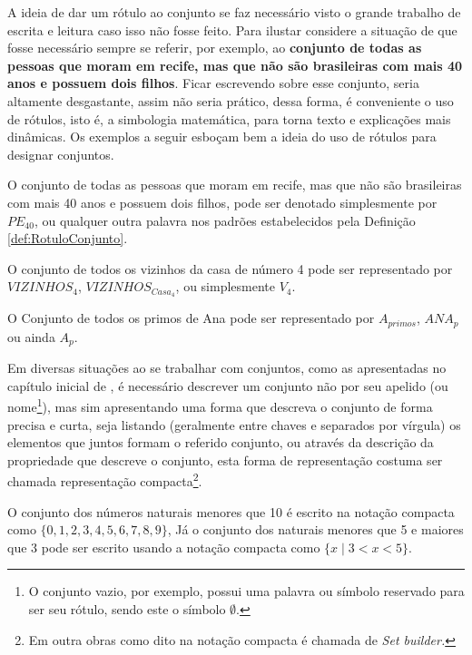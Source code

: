 A ideia de dar um rótulo ao conjunto se faz necessário visto o grande trabalho de escrita e leitura caso isso não fosse feito. Para ilustar considere a situação de que fosse necessário sempre se referir, por exemplo, ao \textbf{conjunto de todas as pessoas que moram em recife, mas que não são brasileiras com mais 40 anos e possuem dois filhos}. Ficar escrevendo sobre esse conjunto, seria altamente desgastante, assim não seria prático, dessa forma, é conveniente o uso de rótulos, isto é, a simbologia matemática, para torna texto e explicações mais dinâmicas. Os exemplos a seguir esboçam bem a ideia do uso de rótulos para designar conjuntos.

\begin{exemplo}\label{exe:RotuloConjunto1}
  O conjunto de todas as pessoas que moram em recife, mas que não são brasileiras com mais 40 anos e possuem dois filhos, pode ser denotado simplesmente por $PE_{40}$, ou qualquer outra palavra nos padrões estabelecidos pela Definição \ref{def:RotuloConjunto}.
\end{exemplo}

\begin{exemplo}\label{exe:RotuloConjunto2}
	O conjunto de todos os vizinhos da casa de número 4 pode ser representado por $VIZINHOS_4$, $VIZINHOS_{Casa_4}$, ou simplesmente  $V_4$.
\end{exemplo}

\begin{exemplo}\label{exe:RotuloConjunto3}
  O Conjunto de todos os primos de Ana pode ser representado por $A_{primos}$, $ANA_{p}$ ou ainda $A_p$.
\end{exemplo}

Em diversas situações ao se trabalhar com conjuntos, como as apresentadas no capítulo inicial de \cite{lipschutz1978-TC}, é necessário descrever um conjunto não por seu apelido (ou nome\footnote{O conjunto vazio, por exemplo, possui uma palavra ou símbolo reservado para ser seu rótulo, sendo este o símbolo $\emptyset$.}), mas sim apresentando uma forma que descreva o conjunto de forma precisa e curta, seja listando (geralmente entre chaves e separados por vírgula) os elementos que juntos formam o referido conjunto, ou através da descrição da propriedade que descreve o conjunto, esta forma de representação costuma ser chamada representação compacta\footnote{Em outra obras como dito \cite{fmcbook} na notação compacta é chamada de \itshape{Set builder}.}.

\begin{exemplo}\label{exe:SetBuilder1}
  O conjunto dos números naturais menores que 10 é escrito na notação compacta como  $\{0, 1, 2, 3, 4, 5, 6, 7, 8, 9\}$, Já o conjunto dos naturais menores que 5 e maiores que 3 pode ser escrito usando a notação compacta como $\{x \mid 3 < x < 5\}$.
\end{exemplo}

